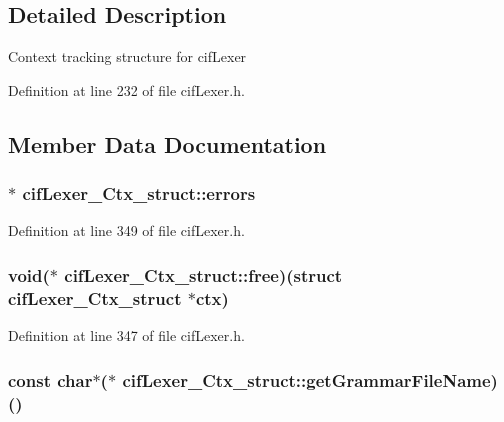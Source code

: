 \subsection{Detailed Description}
Context tracking structure for cif\-Lexer 

Definition at line 232 of file cif\-Lexer.\-h.



\subsection{Member Data Documentation}
\hypertarget{structcif_lexer___ctx__struct_a4dbe3e19dba9d5aa9b5097ba30fb645f}{
\subsubsection[{errors}]{$\ast$ cif\-Lexer\-\_\-\-Ctx\-\_\-struct\-::errors}}\label{structcif_lexer___ctx__struct_a4dbe3e19dba9d5aa9b5097ba30fb645f}


Definition at line 349 of file cif\-Lexer.\-h.

\hypertarget{structcif_lexer___ctx__struct_affa283e9b8b2093f848f7cec0f786ec3}{
\subsubsection[{free}]{\setlength{\rightskip}{0pt plus 5cm}void($\ast$ cif\-Lexer\-\_\-\-Ctx\-\_\-struct\-::free)(struct {\bf cif\-Lexer\-\_\-\-Ctx\-\_\-struct} $\ast$ctx)}}\label{structcif_lexer___ctx__struct_affa283e9b8b2093f848f7cec0f786ec3}


Definition at line 347 of file cif\-Lexer.\-h.

\hypertarget{structcif_lexer___ctx__struct_a2c8792523032943d9b8c91ba037304e5}{
\subsubsection[{get\-Grammar\-File\-Name}]{\setlength{\rightskip}{0pt plus 5cm}const char$\ast$($\ast$ cif\-Lexer\-\_\-\-Ctx\-\_\-struct\-::get\-Grammar\-File\-Name)()}}\label{structcif_lexer___ctx__struct_a2c8792523032943d9b8c91ba037304e5}


